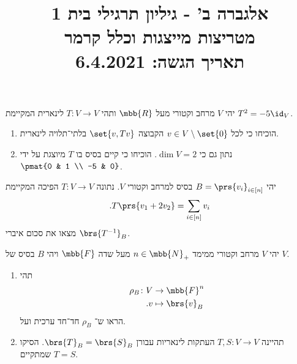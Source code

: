 \documentclass[a4paper,10pt,twoside,openany]{article}
\title{
אלגברה ב' - גיליון תרגילי בית 1 \\
מטריצות מייצגות וכלל קרמר
\\
\vspace{1cm}
\large{תאריך הגשה: 6.4.2021}
}
\date{}
\begin{document}
\maketitle

\begin{exercise}
יהי
$V$
מרחב וקטורי מעל
$\mbb{R}$
ותהי
$T \colon V \to V$
לינארית המקיימת
$T^2 = -5 \id_V$.
\begin{enumerate}
\item הוכיחו כי לכל
$v \in V \setminus \set{0}$
הקבוצה
$\set{v, Tv}$
בלתי־תלויה לינארית.
\item נתון גם כי
$\dim V = 2$.
הוכיחו כי קיים בסיס בו
$T$
מיוצגת על ידי
$\pmat{0 & 1 \\ -5 & 0}$.
\end{enumerate}
\end{exercise}

\begin{exercise}
יהי
$B = \prs{v_i}_{i \in [n]}$
בסיס למרחב וקטורי
$V$.
נתונה
$T \colon V \to V$
הפיכה המקיימת
\[\text{.} T\prs{v_1 + 2 v_2} = \sum_{i \in [n]} v_i\]
מצאו את סכום איברי
$\brs{T^{-1}}_B$.
\end{exercise}

\begin{exercise}
יהי
$V$
מרחב וקטורי ממימד
$n \in \mbb{N}_+$
מעל שדה
$\mbb{F}$
ויהי
$B$
בסיס של
$V$.

\begin{enumerate}
\item 
תהי
\begin{align*}
\rho_B \colon V &\to \mbb{F}^n \\
\text{.} v &\mapsto \brs{v}_B
\end{align*}
הראו ש־%
$\rho_B$
חד־חד ערכית ועל.

\item תהיינה
$T,S \colon V \to V$
העתקות לינאריות עבורן
$\brs{T}_B = \brs{S}_B$.
הסיקו שמתקיים
$T = S$.
\end{enumerate}
\end{exercise}
\end{document}
